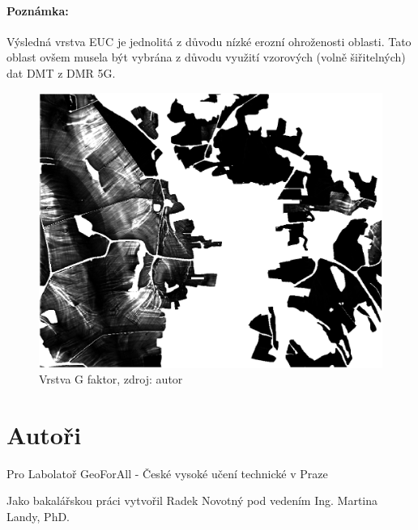 \paragraph{Poznámka:} Výsledná vrstva EUC je jednolitá z důvodu nízké
erozní ohroženosti oblasti. Tato oblast ovšem musela být vybrána z
důvodu využití vzorových (volně šiřitelných) dat DMT z DMR 5G.
\begin{figure}[H] \centering
		\includegraphics[width=.5\textwidth]{./pictures/lokalni_eroze_layer.png}
		\caption[Vrstva G faktor]{Vrstva G faktor, zdroj:
autor}
		\label{g_sample}
\end{figure}
\section{Autoři} Pro Labolatoř GeoForAll - České vysoké učení
technické v Praze

Jako bakalářskou práci vytvořil Radek Novotný pod vedením Ing. Martina
Landy, PhD.
